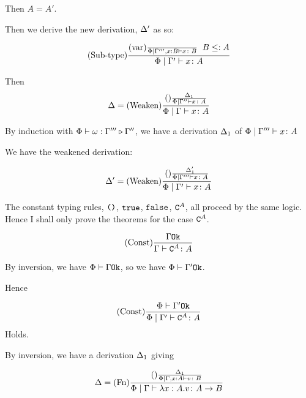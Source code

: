 {        

        Then $A = A'$.

        Then we derive the new derivation, $\Delta'$ as so:

        \begin{equation}
            (\text{Sub-type}) \frac{
                (\text{var}) \frac{}{\Phi\mid\Gamma''', x: B \vdash x \colon B}
                \;\;
                B \leq: A
            }{
                \Phi\mid\Gamma' \vdash x \colon A
            }
        \end{equation}

        Then 
        \begin{equation}
            \Delta = (\text{Weaken}) \frac{(\text{}) \frac{\Delta_1}{\Phi\mid\Gamma'' \vdash x \colon A}}{\Phi\mid\Gamma \vdash x \colon A}
        \end{equation}

        By induction with $\Phi\vdash \omega : \Gamma''' \triangleright \Gamma''$,
         we have a derivation $\Delta_1$ of $\Phi\mid\Gamma''' \vdash x \colon A$

        We have the weakened derivation:

        \begin{equation}
            \Delta' = (\text{Weaken}) \frac{(\text{}) \frac{\Delta_1'}{\Phi\mid\Gamma''' \vdash x \colon A}}{\Phi\mid\Gamma' \vdash x \colon A}
        \end{equation}

    The constant typing rules, $\texttt{()}$, $\texttt{true}$, $\texttt{false}$, $\texttt{C}^{A}$, all proceed by the same logic. Hence I shall only prove the theorems for the case $\texttt{C}^{A}$.

    \begin{equation}
        (\text{Const}) \frac{\Gamma \texttt{Ok}}{\Gamma \vdash \texttt{C}^{A} \colon A}
    \end{equation}

    By inversion, we have $\Phi\vdash \Gamma \texttt{Ok}$, so we have $\Phi\vdash \Gamma' \texttt{Ok}$.

    Hence

    \begin{equation}
        (\text{Const}) \frac{\Phi\vdash \Gamma' \texttt{Ok}}{\Phi\mid\Gamma' \vdash \texttt{C}^{A} \colon A}
    \end{equation}
    Holds.

    By inversion, we have a derivation $\Delta_1$ giving

    \begin{equation}
        \Delta = (\text{Fn}) \frac{
            (\text{}) \frac{\Delta_1}{\Phi\mid\Gamma, x: A \vdash v \colon B}
        }{\Phi\mid\Gamma \vdash \lambda x : A. v \colon A\rightarrow B}
    \end{equation}

}
